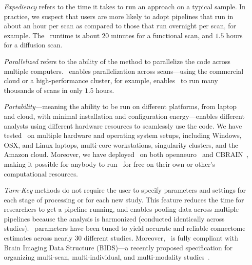 \documentclass[11pt]{article}
\begin{document}
\begin{multicols}{2}
\emph{Expediency} refers to the time it takes to run an approach on a typical sample.  
In practice, we suspect that users are more likely to adopt pipelines that run in about an hour per scan as compared to those that run overnight per scan, for example.
The \ndmg~runtime is about $20$ minutes for a functional scan, and $1.5$ hours for a diffusion scan. 

\emph{Parallelized} refers to the ability of the method to parallelize the code across multiple computers.  \ndmg~enables parallelization across scans---using the commercial cloud or a high-performance cluster, for example, enables \ndmg~to run many thousands of scans in only $1.5$ hours.

\emph{Portability}---meaning the ability to be run on different platforms, from laptop and cloud, with minimal installation and configuration energy---enables different analysts using different hardware resources to seamlessly use the code. We have tested \ndmg~on multiple hardware and operating system setups, including Windows, OSX, and Linux laptops,  multi-core workstations, singularity clusters, and the Amazon cloud.  Moreover, we have deployed \ndmg~on both openneuro~\cite{openneuro} and CBRAIN~\cite{CBRAIN}, making it possible for anybody to  run \ndmg~for free on their own or other's computational resources.  

\emph{Turn-Key} methods do not require the user to specify parameters and settings for each stage of processing or for each new study. This feature reduces the time for researchers to get a pipeline running, and enables pooling data across multiple pipelines because the analysis is harmonized (conducted identically across studies). 
\ndmg~parameters have been tuned to yield accurate and reliable connectome estimates across nearly 30 different studies.  
Moreover, \ndmg~is fully compliant with Brain Imaging Data Structure (BIDS)---a recently proposed specification for organizing multi-scan, multi-individual, and multi-modality studies~\cite{bids, bidsapps}.  


\end{multicols}
\end{document}
